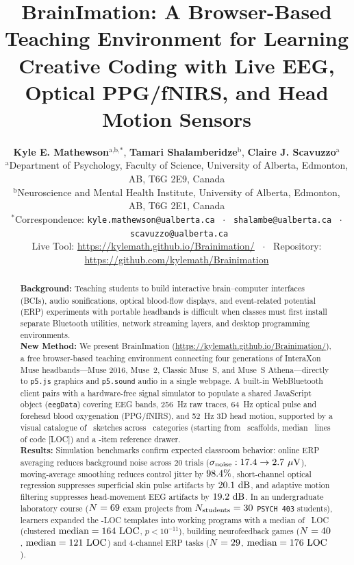 \documentclass[11pt]{article}
\title{\textbf{BrainImation: A Browser-Based Teaching Environment for Learning Creative Coding with Live EEG, Optical PPG/fNIRS, and Head Motion Sensors}}
\author{
\parbox{0.94\textwidth}{\centering
\textbf{Kyle E. Mathewson}$^{\text{a,b,*}}$, \textbf{Tamari Shalamberidze}$^{\text{b}}$, \textbf{Claire J. Scavuzzo}$^{\text{a}}$\\[5pt]
\footnotesize $^{\text{a}}$Department of Psychology, Faculty of Science, University of Alberta, Edmonton, AB, T6G 2E9, Canada\\
\footnotesize $^{\text{b}}$Neuroscience and Mental Health Institute, University of Alberta, Edmonton, AB, T6G 2E1, Canada\\
\footnotesize $^*$Correspondence: \texttt{kyle.mathewson@ualberta.ca} \ $\cdot$ \ \texttt{shalambe@ualberta.ca} \ $\cdot$ \ \texttt{scavuzzo@ualberta.ca}\\
\footnotesize Live Tool: \url{https://kylemath.github.io/Brainimation/} \ $\cdot$ \ Repository: \url{https://github.com/kylemath/Brainimation}
}
}
\date{}
\begin{document}
\maketitle

\begin{abstract}
\noindent\textbf{Background:} Teaching students to build interactive brain--computer interfaces (BCIs), audio sonifications, optical blood-flow displays, and event-related potential (ERP) experiments with portable headbands is difficult when classes must first install separate Bluetooth utilities, network streaming layers, and desktop programming environments.\\
\noindent\textbf{New Method:} We present BrainImation (\url{https://kylemath.github.io/Brainimation/}), a free browser-based teaching environment connecting four generations of InteraXon Muse headbands---Muse 2016, Muse~2, Classic Muse~S, and Muse~S Athena---directly to \texttt{p5.js} graphics and \texttt{p5.sound} audio in a single webpage. A built-in WebBluetooth client pairs with a hardware-free signal simulator to populate a shared JavaScript object (\texttt{eegData}) covering EEG bands, 256~Hz raw traces, 64~Hz optical pulse and forehead blood oxygenation (PPG/fNIRS), and 52~Hz 3D head motion, supported by a visual catalogue of \NCatalogueSketches\ sketches across \NCatalogueCategories\ categories (starting from \NBuiltinExamples\ scaffolds, median \ExLOCMedian\ lines of code [LOC]) and a \NRefAPIs-item reference drawer.\\
\noindent\textbf{Results:} Simulation benchmarks confirm expected classroom behavior: online ERP averaging reduces background noise across 20 trials ($\sigma_{\text{noise}}: 17.4 \rightarrow 2.7\ \mu\text{V}$), moving-average smoothing reduces control jitter by $98.4\%$, short-channel optical regression suppresses superficial skin pulse artifacts by $20.1\text{ dB}$, and adaptive motion filtering suppresses head-movement EEG artifacts by $19.2\text{ dB}$. In an undergraduate laboratory course ($N = 69$ exam projects from $N_{\text{students}} = 30$ \texttt{PSYCH 403} students), learners expanded the \ExLOCMedian-LOC templates into working programs with a median of \StuLOCMedian\ LOC (clustered $\text{median} = 164\text{ LOC}$, $p < 10^{-11}$), building neurofeedback games ($N = 40$, $\text{median} = 121\text{ LOC}$) and 4-channel ERP tasks ($N = 29$, $\text{median} = 176\text{ LOC}$).\\

\end{abstract}
\end{document}
